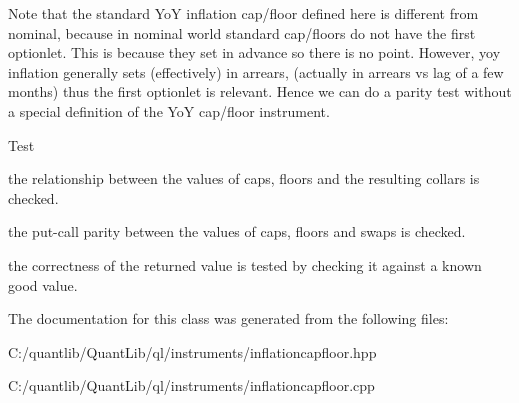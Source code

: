 Note that the standard YoY inflation cap/floor defined here is different from nominal, because in nominal world standard cap/floors do not have the first optionlet. This is because they set in advance so there is no point. However, yoy inflation generally sets (effectively) in arrears, (actually in arrears vs lag of a few months) thus the first optionlet is relevant. Hence we can do a parity test without a special definition of the YoY cap/floor instrument.

\begin{DoxyRefDesc}{Test}
\item[{\bf Test}]
\begin{DoxyItemize}
\item the relationship between the values of caps, floors and the resulting collars is checked.
\item the put-\/call parity between the values of caps, floors and swaps is checked.
\item the correctness of the returned value is tested by checking it against a known good value. 
\end{DoxyItemize}\end{DoxyRefDesc}


The documentation for this class was generated from the following files\+:\begin{DoxyCompactItemize}
\item 
C\+:/quantlib/\+Quant\+Lib/ql/instruments/inflationcapfloor.\+hpp\item 
C\+:/quantlib/\+Quant\+Lib/ql/instruments/inflationcapfloor.\+cpp\end{DoxyCompactItemize}

